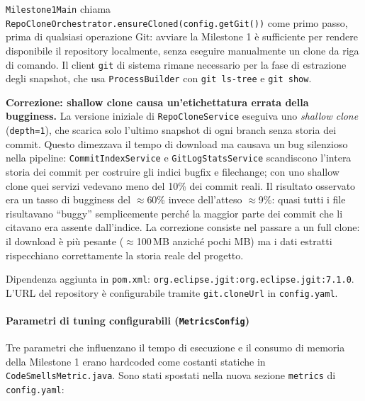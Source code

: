 \texttt{Milestone1Main} chiama \texttt{RepoCloneOrchestrator.ensureCloned(config.getGit())}
come primo passo, prima di qualsiasi operazione Git: avviare la Milestone 1 è sufficiente
per rendere disponibile il repository localmente, senza eseguire manualmente un clone da
riga di comando. Il client \texttt{git} di sistema rimane necessario per la fase di
estrazione degli snapshot, che usa \texttt{ProcessBuilder} con \texttt{git ls-tree} e
\texttt{git show}.

\medskip
\noindent\textbf{Correzione: shallow clone causa un'etichettatura errata della bugginess.}
La versione iniziale di \texttt{RepoCloneService} eseguiva uno \emph{shallow clone}
(\texttt{depth=1}), che scarica solo l'ultimo snapshot di ogni branch senza storia dei
commit. Questo dimezzava il tempo di download ma causava un bug silenzioso nella pipeline:
\texttt{CommitIndexService} e \texttt{GitLogStatsService} scandiscono l'intera storia dei
commit per costruire gli indici bug\-fix e file\-change; con uno shallow clone quei
servizi vedevano meno del 10\% dei commit reali. Il risultato osservato era un tasso di
bugginess del $\approx$60\% invece dell'atteso $\approx$9\%: quasi tutti i file
risultavano ``buggy'' semplicemente perché la maggior parte dei commit che li citavano
era assente dall'indice. La correzione consiste nel passare a un full clone: il download
è più pesante ($\approx$100\,MB anziché pochi MB) ma i dati estratti rispecchiano
correttamente la storia reale del progetto.

Dipendenza aggiunta in \texttt{pom.xml}: \texttt{org.eclipse.jgit:org.eclipse.jgit:7.1.0}.
L'URL del repository è configurabile tramite \texttt{git.cloneUrl} in \texttt{config.yaml}.

\paragraph{Parametri di tuning configurabili (\texttt{MetricsConfig})}

Tre parametri che influenzano il tempo di esecuzione e il consumo di memoria della
Milestone 1 erano hardcoded come costanti statiche in \texttt{CodeSmellsMetric.java}.
Sono stati spostati nella nuova sezione \texttt{metrics} di \texttt{config.yaml}:

